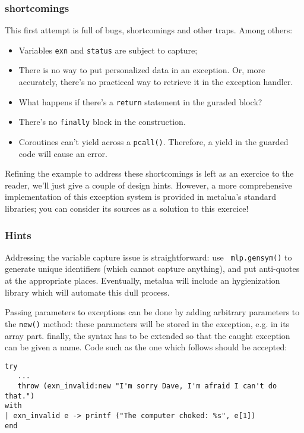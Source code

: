 \subsubsection{shortcomings}
This first attempt is full of bugs, shortcomings and other
traps. Among others:
\begin{itemize}
\item Variables {\tt exn} and {\tt status} are subject to capture;
\item There is no way to put personalized data in an exception. Or,
  more accurately, there's no practiccal way to retrieve it in the
  exception handler.
\item What happens if there's a {\tt return} statement in the guraded
  block?
\item There's no {\tt finally} block in the construction.
\item Coroutines can't yield across a {\tt pcall()}. Therefore, a
yield in the guarded code will cause an error.
\end{itemize}

Refining the example to address these shortcomings is left as an
exercice to the reader, we'll just give a couple of design
hints. However, a more comprehensive implementation of this exception
system is provided in metalua's standard libraries; you can consider
its sources as a solution to this exercice!

\subsubsection{Hints}
Addressing the variable capture issue is straightforward: use {\tt
  mlp.gensym()} to generate unique identifiers (which cannot capture
anything), and put anti-quotes at the appropriate places. Eventually,
metalua will include an hygienization library which will automate this
dull process. 

Passing parameters to exceptions can be done by adding arbitrary
parameters to the {\tt new()} method: these parameters will be stored
in the exception, e.g. in its array part. finally, the
syntax has to be extended so that the caught exception can be given a
name. Code such as the one which follows should be accepted:

\begin{Verbatim}[fontsize=\scriptsize]
try
   ...
   throw (exn_invalid:new "I'm sorry Dave, I'm afraid I can't do that.")
with
| exn_invalid e -> printf ("The computer choked: %s", e[1])
end
\end{Verbatim}

